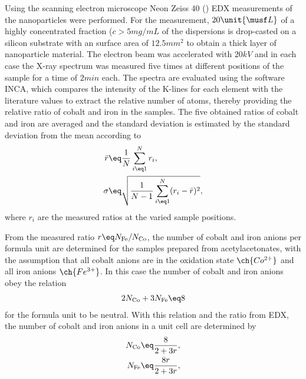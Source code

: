 \documentclass[\main/dresen_thesis.tex]{subfiles}
\begin{document}
    Using the scanning electron microscope Neon Zeiss 40 () EDX measurements of the nanoparticles were performed.
    For the measurement, $20 \unit{\musf L}$ of a highly concentrated fraction ($c > 5 \unit{mg/mL}$ of the dispersions is drop-casted on a silicon substrate with an surface area of $12.5 \unit{mm^2}$ to obtain a thick layer of nanoparticle material.
    The electron beam was accelerated with $20 \unit{kV}$ and in each case the X-ray spectrum was measured five times at different positions of the sample for a time of $2 \unit{min}$ each.
    The spectra are evaluated using the software INCA, which compares the intensity of the K-lines for each element with the literature values to extract the relative number of atoms, thereby providing the relative ratio of cobalt and iron in the samples.
    The five obtained ratios of cobalt and iron are averaged and the standard deviation is estimated by the standard deviation from the mean according to
    \begin{align}
      \bar{r} &\eq \frac{1}{N} \sum_{i \eq 1}^N r_i,\\
      \sigma &\eq \sqrt{\frac{1}{N-1} \sum_{i \eq 1}^N (r_i - \bar{r})^2},
    \end{align}
    where $r_i$ are the measured ratios at the varied sample positions.

    From the measured ratio $r \eq N_\mathrm{Fe} / N_\mathrm{Co}$, the number of cobalt and iron anions per formula unit are determined for the samples prepared from acetylacetonates, with the assumption that all cobalt anions are in the oxidation state $\ch{Co^{2+}}$ and all iron anions $\ch{Fe^{3+}}$.
    In this case the number of cobalt and iron anions obey the relation
    \begin{align}
      2 N_\mathrm{Co} + 3 N_\mathrm{Fe} \eq 8
    \end{align}
    for the formula unit to be neutral.
    With this relation and the ratio from EDX, the number of cobalt and iron anions in a unit cell are determined by
    \begin{align}
      N_\mathrm{Co} \eq \frac{8}{2 + 3r},\\
      N_\mathrm{Fe} \eq \frac{8r}{2 + 3r},
    \end{align}
\end{document}
